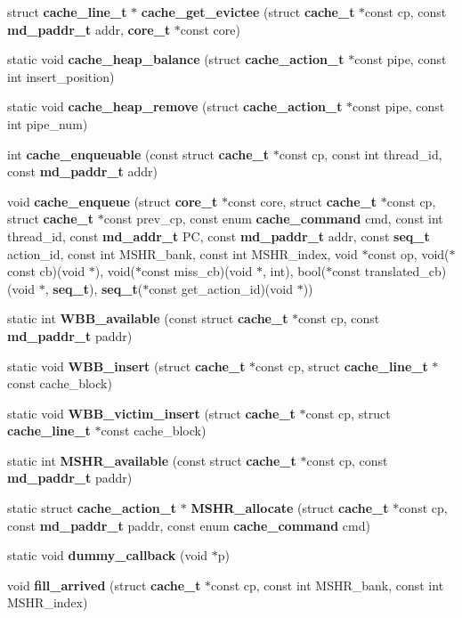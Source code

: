 \begin{CompactItemize}
\item 
struct {\bf cache\_\-line\_\-t} $\ast$ {\bf cache\_\-get\_\-evictee} (struct {\bf cache\_\-t} $\ast$const cp, const {\bf md\_\-paddr\_\-t} addr, {\bf core\_\-t} $\ast$const core)
\item 
static void {\bf cache\_\-heap\_\-balance} (struct {\bf cache\_\-action\_\-t} $\ast$const pipe, const int insert\_\-position)
\item 
static void {\bf cache\_\-heap\_\-remove} (struct {\bf cache\_\-action\_\-t} $\ast$const pipe, const int pipe\_\-num)
\item 
int {\bf cache\_\-enqueuable} (const struct {\bf cache\_\-t} $\ast$const cp, const int thread\_\-id, const {\bf md\_\-paddr\_\-t} addr)
\item 
void {\bf cache\_\-enqueue} (struct {\bf core\_\-t} $\ast$const core, struct {\bf cache\_\-t} $\ast$const cp, struct {\bf cache\_\-t} $\ast$const prev\_\-cp, const enum {\bf cache\_\-command} cmd, const int thread\_\-id, const {\bf md\_\-addr\_\-t} PC, const {\bf md\_\-paddr\_\-t} addr, const {\bf seq\_\-t} action\_\-id, const int MSHR\_\-bank, const int MSHR\_\-index, void $\ast$const op, void($\ast$const cb)(void $\ast$), void($\ast$const miss\_\-cb)(void $\ast$, int), bool($\ast$const translated\_\-cb)(void $\ast$, {\bf seq\_\-t}), {\bf seq\_\-t}($\ast$const get\_\-action\_\-id)(void $\ast$))
\item 
static int {\bf WBB\_\-available} (const struct {\bf cache\_\-t} $\ast$const cp, const {\bf md\_\-paddr\_\-t} paddr)
\item 
static void {\bf WBB\_\-insert} (struct {\bf cache\_\-t} $\ast$const cp, struct {\bf cache\_\-line\_\-t} $\ast$const cache\_\-block)
\item 
static void {\bf WBB\_\-victim\_\-insert} (struct {\bf cache\_\-t} $\ast$const cp, struct {\bf cache\_\-line\_\-t} $\ast$const cache\_\-block)
\item 
static int {\bf MSHR\_\-available} (const struct {\bf cache\_\-t} $\ast$const cp, const {\bf md\_\-paddr\_\-t} paddr)
\item 
static struct {\bf cache\_\-action\_\-t} $\ast$ {\bf MSHR\_\-allocate} (struct {\bf cache\_\-t} $\ast$const cp, const {\bf md\_\-paddr\_\-t} paddr, const enum {\bf cache\_\-command} cmd)
\item 
static void {\bf dummy\_\-callback} (void $\ast$p)
\item 
void {\bf fill\_\-arrived} (struct {\bf cache\_\-t} $\ast$const cp, const int MSHR\_\-bank, const int MSHR\_\-index)
\item 

\end{CompactItemize}

